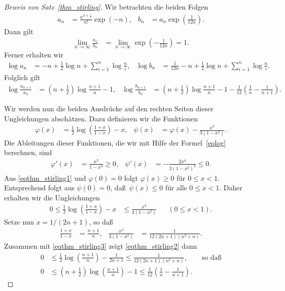 \documentclass[10pt,reqno]{amsart}
\numberwithin{equation}{section}
\newcommand\bc[1]{\left({#1}\right)}
\newcommand\bcfr[2]{\bc{\frac{#1}{#2}}}
\newcommand\Thm{Satz}
\begin{document}
\begin{proof}[Beweis von \Thm~\ref{thm_stirling}]
	Wir betrachten die beiden Folgen
	\begin{align*}
		a_n&=\frac{n^{n+\frac12}}{n!}\exp(-n),&b_n&=a_n\exp\bcfr1{12n}.
	\end{align*}
	Dann gilt
	\begin{align}\label{eqthm_stirling0}
		\lim_{n\to\infty}\frac{a_n}{b_n}&=\lim_{n\to\infty}\exp\bc{-\frac1{12n}}=1.
	\end{align}
	Ferner erhalten wir 
	\begin{align*}
		\log a_n&=-n+\frac12\log n+\sum_{i=1}^n\log\frac ni,&\log b_n&=\frac1{12n}-n+\frac12\log n+\sum_{i=1}^n\log\frac ni.
	\end{align*}
	Folglich gilt
	\begin{align}\label{eqthm_stirling7}
		\log\frac{a_{n+1}}{a_n}&=\bc{n+\frac12}\log\frac{n+1}n-1,&
		\log\frac{b_{n+1}}{b_n}&=\bc{n+\frac12}\log\frac{n+1}n-1-\frac1{12}\bc{\frac1n-\frac1{n+1}}.
	\end{align}

	Wir werden nun die beiden Ausdr\"ucke auf den rechten Seiten dieser Ungleichungen absch\"atzen.
	Dazu definieren wir die Funktionen
	\begin{align*}
		\varphi(x)&=\frac12\log\bcfr{1+x}{1-x}-x,&\psi(x)&=\varphi(x)-\frac{x^3}{3(1-x^2)}.
	\end{align*}
	Die Ableitungen dieser Funktionen, die wir mit Hilfe der Formel~\eqref{eqlog} berechnen, sind
	\begin{align}\label{eqthm_stirling1}
		\varphi'(x)&=\frac{x^2}{1-x^2}\geq0,&\psi'(x)&=-\frac{2x^4}{3(1-x^2)^2}\leq0.
	\end{align}
	Aus \eqref{eqthm_stirling1} und $\varphi(0)=0$ folgt $\varphi(x)\geq0$ f\"ur $0\leq x<1$.
	Entsprechend folgt aus $\psi(0)=0$, da\ss\ $\psi(x)\leq0$ f\"ur alle $0\leq x<1$.
	Daher erhalten wir die Ungleichungen
	\begin{align}\label{eqthm_stirling2}
		0\leq\frac12\log\bcfr{1+x}{1-x}-x&\leq\frac{x^3}{3(1-x^2)}&&(0\leq x<1).
	\end{align}
	Setze nun $x=1/(2n+1)$, so da\ss\
	\begin{align}\label{eqthm_stirling3}
		\frac{1+x}{1-x}&=\frac{n+1}n,&\frac{x^3}{3(1-x^2)}&=\frac1{12(2n+1)(n^2+n)}.
	\end{align}
	Zusammen mit \eqref{eqthm_stirling3} zeigt \eqref{eqthm_stirling2} dann
	\begin{align}%
		0&\leq\frac12\log\bcfr{n+1}n-\frac1{2n+1}\leq\frac1{12(2n+1)(n^2+n)},\qquad\mbox{so da\ss}\nonumber\\
		0&\leq\bc{n+\frac12}\log\bcfr{n+1}n-1\leq\frac1{12}\bc{\frac1n-\frac1{n+1}}.\label{eqthm_stirling4}
	\end{align}


\end{proof}
\end{document}
